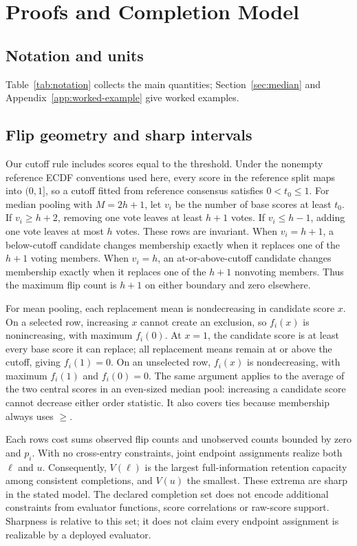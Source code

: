 \section{Proofs and Completion Model}
\label{app:proofs}
\subsection{Notation and units}
Table~\ref{tab:notation} collects the main quantities; Section~\ref{sec:median} and Appendix~\ref{app:worked-example} give worked examples.

\subsection{Flip geometry and sharp intervals}
Our cutoff rule includes scores equal to the threshold. Under the nonempty reference ECDF conventions used here, every score in the reference split maps into $(0,1]$, so a cutoff fitted from reference consensus satisfies $0<t_0\le1$. For median pooling with $M=2h+1$, let $v_i$ be the number of base scores at least $t_0$. If $v_i\ge h+2$, removing one vote leaves at least $h+1$ votes. If $v_i\le h-1$, adding one vote leaves at most $h$ votes. These rows are invariant. When $v_i=h+1$, a below-cutoff candidate changes membership exactly when it replaces one of the $h+1$ voting members. When $v_i=h$, an at-or-above-cutoff candidate changes membership exactly when it replaces one of the $h+1$ nonvoting members. Thus the maximum flip count is $h+1$ on either boundary and zero elsewhere.

For mean pooling, each replacement mean is nondecreasing in candidate score $x$. On a selected row, increasing $x$ cannot create an exclusion, so $f_i(x)$ is nonincreasing, with maximum $f_i(0)$. At $x=1$, the candidate score is at least every base score it can replace; all replacement means remain at or above the cutoff, giving $f_i(1)=0$. On an unselected row, $f_i(x)$ is nondecreasing, with maximum $f_i(1)$ and $f_i(0)=0$. The same argument applies to the average of the two central scores in an even-sized median pool: increasing a candidate score cannot decrease either order statistic. It also covers ties because membership always uses $\ge$.

Each row\textquotesingle s cost sums observed flip counts and unobserved counts bounded by zero and $p_i$. With no cross-entry constraints, joint endpoint assignments realize both $\ell$ and $u$. Consequently, $V(\ell)$ is the largest full-information retention capacity among consistent completions, and $V(u)$ the smallest. These extrema are sharp in the stated model. The declared completion set does not encode additional constraints from evaluator functions, score correlations or raw-score support. Sharpness is relative to this set; it does not claim every endpoint assignment is realizable by a deployed evaluator.

